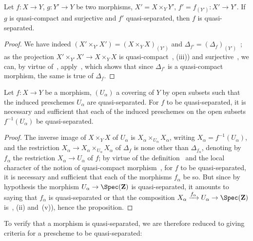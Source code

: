 \begin{proposition}[1.2.5]
\label{IV.1.2.5}
Let $f:X\to Y$, $g:Y'\to Y$ be two morphisms, $X'=X\times_Y Y'$,
$f'=f_{(Y')}:X'\to Y'$. If $g$ is quasi-compact and surjective and $f'$ quasi-separated, then $f$ is
quasi-separated.
\end{proposition}

\begin{proof}
We have indeed $(X'\times_{Y'} X')=(X\times_Y X)_{(Y')}$ and $\Delta_{f'}=(\Delta_f)_{(Y')}$~; as the
projection $X'\times_{Y'} X'\to X\times_Y X$ is quasi-compact~, (iii)) and surjective~,
we can, by virtue of~, apply~, which shows that since $\Delta_{f'}$ is
a quasi-compact morphism, the same is true of $\Delta_f$.
\end{proof}

\begin{proposition}[1.2.6]
\label{IV.1.2.6}
Let $f:X\to Y$ be a morphism, $(U_\alpha)$ a covering of $Y$
by open subsets such that the induced preschemes $U_\alpha$ are quasi-separated. For $f$ to be quasi-separated, it is necessary and sufficient that each of the induced preschemes on the open subsets $f^{-1}(U_\alpha)$ be
quasi-separated.
\end{proposition}

\begin{proof}
The inverse image of $X\times_Y X$ of $U_\alpha$ is $X_\alpha\times_{U_\alpha} X_\alpha$, writing $X_\alpha=f^{-1}(U_\alpha)$,
and the restriction $X_\alpha\to X_\alpha\times_{U_\alpha} X_\alpha$ of $\Delta_f$ is none other than $\Delta_{f_\alpha}$, denoting by $f_\alpha$ the restriction
$X_\alpha\to U_\alpha$ of $f$; by virtue of the definition~ and the local character of the notion of
quasi-compact morphism~, for $f$ to be quasi-separated, it is necessary and sufficient that
each of the morphisms $f_\alpha$ be so. But since by hypothesis the morphism $U_\alpha\to\Spec(\mathbf{Z})$
is quasi-separated, it amounts to saying that $f_\alpha$ is quasi-separated or that the composition
$X_\alpha\xrightarrow{f_\alpha} U_\alpha\to\Spec(\mathbf{Z})$ is~, (ii) and~(v)), hence the proposition.
\end{proof}


To verify that a morphism is quasi-separated, we are therefore reduced to giving
criteria for a prescheme to be quasi-separated:

